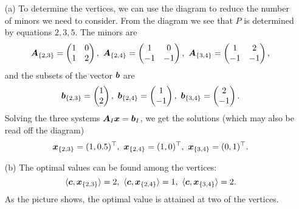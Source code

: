\documentclass{article}
\begin{document}
\begin{itemize}
 \item[(a)] To determine the vertices, we can use the diagram to reduce the number of minors we need to consider. From the diagram we see that $P$ is determined by equations $2,3,5$. The minors are
 \begin{equation*}
  \mtx{A}_{\{2,3\}} = \begin{pmatrix}
                       1 & 0\\ 1 & 2
                      \end{pmatrix}, \ 
\mtx{A}_{\{2,4\}} = \begin{pmatrix}
                       1 & 0\\ -1 & -1
                      \end{pmatrix}, \
\mtx{A}_{\{3,4\}} = \begin{pmatrix}
                       1 & 2\\ -1 & -1
                      \end{pmatrix},
 \end{equation*}
 and the subsets of the vector $\bm{b}$ are
 \begin{equation*}
  \vct{b}_{\{2,3\}} =  \begin{pmatrix}
                        1\\ 2
                       \end{pmatrix}, \ 
\vct{b}_{\{2,4\}} =  \begin{pmatrix}
                        1\\ -1
                       \end{pmatrix}, \ 
\vct{b}_{\{3,4\}} =  \begin{pmatrix}
                        2\\ -1
                       \end{pmatrix}. 
 \end{equation*}
Solving the three systems $\bm{A}_I\bm{x}=\bm{b}_I$, we get the solutions (which may also be read off the diagram)
\begin{equation*}
 \vct{x}_{\{2,3\}} = (1,0.5)^{\trans}, \ \vct{x}_{\{2,4\}} = (1,0)^{\trans}, \ \vct{x}_{\{3,4\}} = (0,1)^{\trans}.
\end{equation*}
 \item[(b)] The optimal values can be found among the vertices:
 \begin{equation*}
  \ip{\vct{c}}{\vct{x}_{\{2,3\}}} = 2, \  \ip{\vct{c}}{\vct{x}_{\{2,4\}}} = 1, \ \ip{\vct{c}}{\vct{x}_{\{3,4\}}} = 2. 
 \end{equation*}
As the picture shows, the optimal value is attained at two of the vertices. 

\end{itemize}
\end{document}
